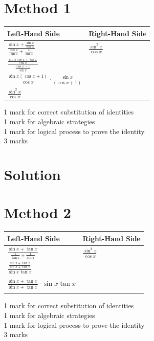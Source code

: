 \documentclass[10pt]{article}
\begin{document}
\section*{Method 1}
\begin{center}
\begin{tabular}{|l|l|}
\hline
Left-Hand Side & Right-Hand Side \\
\hline
$\frac{\sin x+\frac{\sin x}{\cos x}}{\frac{\cos x}{\sin x}+\frac{1}{\sin x}}$ & $\frac{\sin ^{2} x}{\cos x}$ \\
\hline
$\frac{\frac{\sin x \cos x+\sin x}{\cos x}}{\frac{\cos x+1}{\sin x}}$ &  \\
\hline
$\frac{\sin x(\cos x+1)}{\cos x} \cdot \frac{\sin x}{(\cos x+1)}$ &  \\
\hline
$\frac{\sin ^{2} x}{\cos x}$ &  \\
\hline
\end{tabular}
\end{center}

1 mark for correct substitution of identities\\
1 mark for algebraic strategies\\
1 mark for logical process to prove the identity\\
3 marks

\section*{Solution}
\section*{Method 2}
\begin{center}
\begin{tabular}{|l|l|}
\hline
Left-Hand Side & Right-Hand Side \\
\hline
$\frac{\sin x+\tan x}{\frac{1}{\tan x}+\frac{1}{\sin x}}$ & $\frac{\sin ^{2} x}{\cos x}$ \\
\hline
$\frac{\frac{\sin x+\tan x}{\sin x+\tan x}}{\sin x \tan x}$ &  \\
\hline
 &  \\
\hline
\( \frac{\sin x+\tan x}{\sin x+\tan x} \cdot \sin x \tan x \) &  \\
\hline
 &  \\
\hline
\end{tabular}
\end{center}

1 mark for correct substitution of identities\\
1 mark for algebraic strategies\\
1 mark for logical process to prove the identity\\
3 marks
\end{document}
